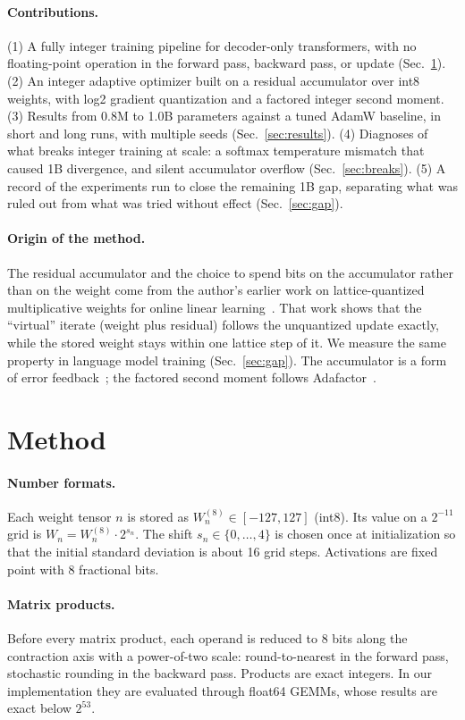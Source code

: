 \documentclass[11pt]{article}
\begin{document}
\paragraph{Contributions.}
(1) A fully integer training pipeline for decoder-only transformers, with no floating-point operation in the forward pass, backward pass, or update (Sec.~\ref{sec:method}).
(2) An integer adaptive optimizer built on a residual accumulator over int8 weights, with log2 gradient quantization and a factored integer second moment.
(3) Results from 0.8M to 1.0B parameters against a tuned AdamW baseline, in short and long runs, with multiple seeds (Sec.~\ref{sec:results}).
(4) Diagnoses of what breaks integer training at scale: a softmax temperature mismatch that caused 1B divergence, and silent accumulator overflow (Sec.~\ref{sec:breaks}).
(5) A record of the experiments run to close the remaining 1B gap, separating what was ruled out from what was tried without effect (Sec.~\ref{sec:gap}).

\paragraph{Origin of the method.} The residual accumulator and the choice to spend bits on the accumulator rather than on the weight come from the author's earlier work on lattice-quantized multiplicative weights for online linear learning~\cite{kafes}. That work shows that the ``virtual'' iterate (weight plus residual) follows the unquantized update exactly, while the stored weight stays within one lattice step of it. We measure the same property in language model training (Sec.~\ref{sec:gap}). The accumulator is a form of error feedback~\cite{ef}; the factored second moment follows Adafactor~\cite{adafactor}.

\section{Method}\label{sec:method}
\paragraph{Number formats.} Each weight tensor $n$ is stored as $W^{(8)}_n \in [-127,127]$ (int8). Its value on a $2^{-11}$ grid is $W_n = W^{(8)}_n \cdot 2^{s_n}$. The shift $s_n\in\{0,\dots,4\}$ is chosen once at initialization so that the initial standard deviation is about 16 grid steps. Activations are fixed point with 8 fractional bits.

\paragraph{Matrix products.} Before every matrix product, each operand is reduced to 8 bits along the contraction axis with a power-of-two scale: round-to-nearest in the forward pass, stochastic rounding in the backward pass. Products are exact integers. In our implementation they are evaluated through float64 GEMMs, whose results are exact below $2^{53}$.
\end{document}
